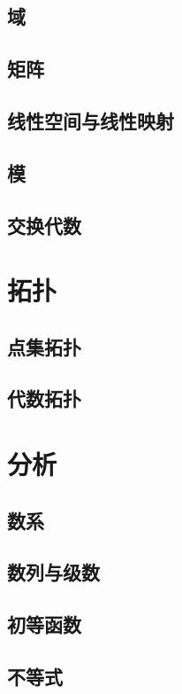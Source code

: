 \documentclass{book}
\begin{document}
\chapter{域}

\chapter{矩阵}
\chapter{线性空间与线性映射}

\chapter{模}

\chapter{交换代数}

\part{拓扑}
\chapter{点集拓扑}

\chapter{代数拓扑}


\part{分析}
\chapter{数系}


\chapter{数列与级数}


\chapter{初等函数}


\chapter{不等式}

\end{document}
